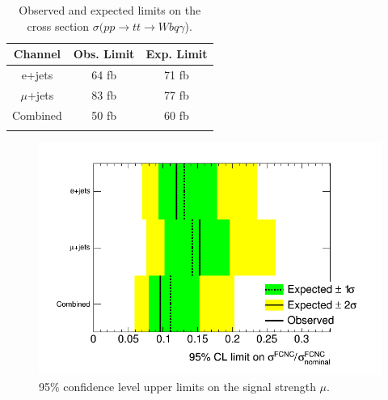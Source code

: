 \begin{table}[h!]
\begin{center}
{\renewcommand{\arraystretch}{1.2}
\begin{tabular}{ccc}
\hhline{===}
Channel  	&  Obs. Limit	& Exp. Limit	 \\  \hline 
e+jets	& 64 fb	& 71 fb 	\\ 
$\mu$+jets	& 83 fb	& 77 fb 	\\ 
Combined	& 50 fb	& 60 fb 	\\
\hhline{===}
\end{tabular}
\caption{Observed and expected limits on the cross section $\sigma(pp\rightarrow tt \rightarrow Wb q \gamma$).}
\label{tab:UpperLimitsXS}
}
\end{center}
\end{table}

\begin{figure}[ht!]
	\centering
	\includegraphics[width=0.5\columnwidth]{../ThesisImages/RegionPlots/FinalRegions/Systematics/MQGamEJetPHptMJet/LimitPlot.png}
	\caption{95\% confidence level upper limits on the signal strength $\mu$.
	}
	\label{fig:UpperLimMu}
\end{figure}
%
